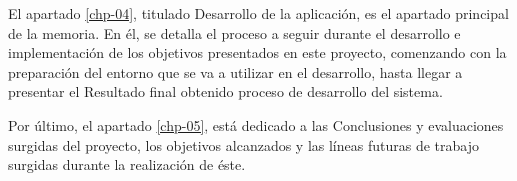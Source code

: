 El apartado \ref{chp-04}, titulado Desarrollo de la aplicación, es el apartado principal de la memoria. En él, se detalla el proceso a seguir durante el desarrollo e implementación de los objetivos presentados en este proyecto, comenzando con la preparación del entorno que se va a utilizar en el desarrollo, hasta llegar a presentar el Resultado final obtenido proceso de desarrollo del sistema.

Por último, el apartado \ref{chp-05}, está dedicado a las Conclusiones y evaluaciones surgidas del proyecto, los objetivos alcanzados y las líneas futuras de trabajo surgidas durante la realización de éste.

\endinput
